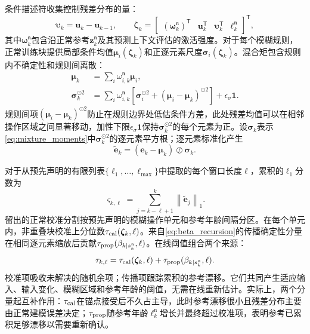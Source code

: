 \documentclass[journal]{IEEEtran}
\newcommand{\norm}[1]{\left\lVert #1\right\rVert}
\newcommand{\T}{\mathsf T}
\newcommand{\1}{\bm 1}
\begin{document}
条件描述符收集控制残差分布的量：
\begin{equation}
\bm\upsilon_k=\bm u_k-\bm u_{k-1},\qquad
\bm\zeta_k=
\begin{bmatrix}
(\bm\omega_k^{\mathfrak n})^\T&
\bm u_k^\T&
\bm\upsilon_k^\T&
\ell_k^{\mathfrak n}
\end{bmatrix}^{\T},
\label{eq:descriptor}
\end{equation}
其中$\bm\omega_k^{\mathfrak n}$包含沿正常参考$\bm z_k^{\mathfrak n}$及其预测上下文评估的激活强度。对于每个模糊规则，正常训练块提供局部条件均值$\bm\mu_i(\bm\zeta_k)$和正逐元素尺度$\bm\sigma_i(\bm\zeta_k)$。混合矩包含规则内不确定性和规则间离散：
\begin{equation}
\begin{aligned}
\bm\mu_k&=\sum_i\omega_{i,k}^{\mathfrak n}\bm\mu_i,\\
\bm\sigma_k^{\odot2}
&=\sum_i\omega_{i,k}^{\mathfrak n}
\left[
\bm\sigma_i^{\odot2}
+(\bm\mu_i-\bm\mu_k)^{\odot2}
\right]+\epsilon_\sigma\1 .
\end{aligned}
\label{eq:mixture_moments}
\end{equation}
规则间项$(\bm\mu_i-\bm\mu_k)^{\odot2}$防止在规则边界处低估条件方差，此处残差均值可以在相邻操作区域之间显著移动，加性下限$\epsilon_\sigma\1$保持$\bm\sigma_k^{\odot2}$的每个元素为正。设$\bm\sigma_k$表示\eqref{eq:mixture_moments}中$\bm\sigma_k^{\odot2}$的逐元素平方根；逐元素标准化产生
\begin{equation}
\widetilde{\bm e}_k=
(\bm e_k-\bm\mu_k)\oslash\bm\sigma_k.
\label{eq:standardized_residual}
\end{equation}

对于从预先声明的有限列表$\{\ell_1,\ldots,\ell_{\max}\}$中提取的每个窗口长度$\ell$，累积的$\ell_1$分数为
\begin{equation}
\varsigma_{k,\ell}=
\sum_{j=k-\ell+1}^{k}\norm{\widetilde{\bm e}_j}_1.
\label{eq:window_score}
\end{equation}
留出的正常校准分割按预先声明的模糊操作单元和参考年龄间隔分区。在每个单元内，非重叠块校准上分位数$\tau_{\rm cal}(\bm\zeta_k,\ell)$。来自\eqref{eq:beta_recursion}的传播确定性分量在相同逐元素缩放后贡献$\tau_{\rm prop}(\beta_{k\mid s_k^{\mathfrak n}},\ell)$。在线阈值组合两个来源：
\begin{equation}
\tau_{k,\ell}=
\tau_{\rm cal}(\bm\zeta_k,\ell)
+\tau_{\rm prop}(\beta_{k\mid s_k^{\mathfrak n}},\ell).
\label{eq:dynamic_threshold}
\end{equation}
校准项吸收未解决的随机余项；传播项跟踪累积的参考漂移。它们共同产生适应输入、输入变化、模糊区域和参考年龄的阈值，无需在线重新估计。实际上，两个分量起互补作用：$\tau_{\rm cal}$在锚点接受后不久占主导，此时参考漂移很小且残差分布主要由正常建模误差决定；$\tau_{\rm prop}$随参考年龄$\ell_k^{\mathfrak n}$增长并最终超过校准项，表明参考已累积足够漂移以需要重新确认。
\end{document}
